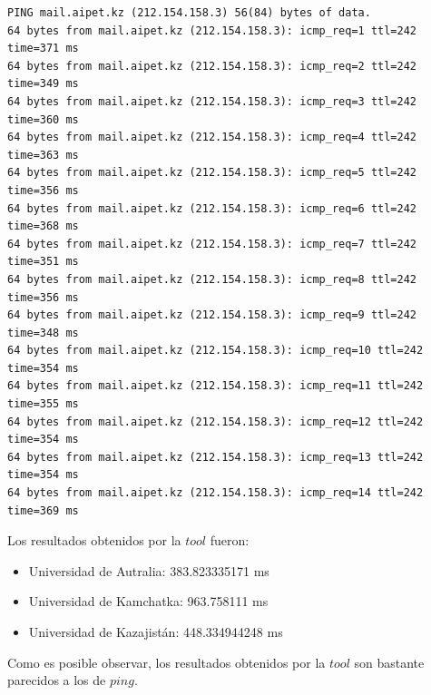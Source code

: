 \begin{verbatim}
PING mail.aipet.kz (212.154.158.3) 56(84) bytes of data.
64 bytes from mail.aipet.kz (212.154.158.3): icmp_req=1 ttl=242 time=371 ms
64 bytes from mail.aipet.kz (212.154.158.3): icmp_req=2 ttl=242 time=349 ms
64 bytes from mail.aipet.kz (212.154.158.3): icmp_req=3 ttl=242 time=360 ms
64 bytes from mail.aipet.kz (212.154.158.3): icmp_req=4 ttl=242 time=363 ms
64 bytes from mail.aipet.kz (212.154.158.3): icmp_req=5 ttl=242 time=356 ms
64 bytes from mail.aipet.kz (212.154.158.3): icmp_req=6 ttl=242 time=368 ms
64 bytes from mail.aipet.kz (212.154.158.3): icmp_req=7 ttl=242 time=351 ms
64 bytes from mail.aipet.kz (212.154.158.3): icmp_req=8 ttl=242 time=356 ms
64 bytes from mail.aipet.kz (212.154.158.3): icmp_req=9 ttl=242 time=348 ms
64 bytes from mail.aipet.kz (212.154.158.3): icmp_req=10 ttl=242 time=354 ms
64 bytes from mail.aipet.kz (212.154.158.3): icmp_req=11 ttl=242 time=355 ms
64 bytes from mail.aipet.kz (212.154.158.3): icmp_req=12 ttl=242 time=354 ms
64 bytes from mail.aipet.kz (212.154.158.3): icmp_req=13 ttl=242 time=354 ms
64 bytes from mail.aipet.kz (212.154.158.3): icmp_req=14 ttl=242 time=369 ms
\end{verbatim}

Los resultados obtenidos por la $tool$ fueron:

\begin{itemize}
	\item Universidad de Autralia: 383.823335171 ms
	\item Universidad de Kamchatka: 963.758111 ms
	\item Universidad de Kazajistán: 448.334944248 ms
\end{itemize}

Como es posible observar, los resultados obtenidos por la $tool$ son bastante parecidos a los de $ping$.